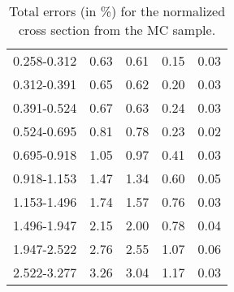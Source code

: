 \begin{table}
\begin{center}
\begin{tabular}{@{}l l l l l@{}}
            0.258-0.312 & 0.63 & 0.61 & 0.15 & 0.03  \\
            0.312-0.391 & 0.65 & 0.62 & 0.20 & 0.03  \\
            0.391-0.524 & 0.67 & 0.63 & 0.24 & 0.03  \\
            0.524-0.695 & 0.81 & 0.78 & 0.23 & 0.02  \\
            0.695-0.918 & 1.05 & 0.97 & 0.41 & 0.03  \\
            0.918-1.153 & 1.47 & 1.34 & 0.60 & 0.05  \\
            1.153-1.496 & 1.74 & 1.57 & 0.76 & 0.03  \\
            1.496-1.947 & 2.15 & 2.00 & 0.78 & 0.04  \\
            1.947-2.522 & 2.76 & 2.55 & 1.07 & 0.06  \\
            2.522-3.277 & 3.26 & 3.04 & 1.17 & 0.03  \\
            \bottomrule
        \end{tabular}
    \end{center}
    \caption{
        Total errors (in \%) for the normalized cross section from the
        \POWHEG MC sample.
    }
    \label{tab:powheg_uncert_norm}
\end{table}
